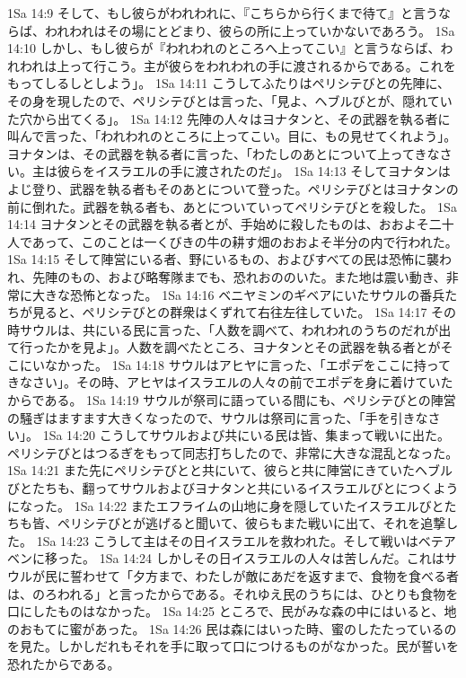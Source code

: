 1Sa 14:9  そして、もし彼らがわれわれに、『こちらから行くまで待て』と言うならば、われわれはその場にとどまり、彼らの所に上っていかないであろう。
1Sa 14:10  しかし、もし彼らが『われわれのところへ上ってこい』と言うならば、われわれは上って行こう。主が彼らをわれわれの手に渡されるからである。これをもってしるしとしよう」。
1Sa 14:11  こうしてふたりはペリシテびとの先陣に、その身を現したので、ペリシテびとは言った、「見よ、ヘブルびとが、隠れていた穴から出てくる」。
1Sa 14:12  先陣の人々はヨナタンと、その武器を執る者に叫んで言った、「われわれのところに上ってこい。目に、もの見せてくれよう」。ヨナタンは、その武器を執る者に言った、「わたしのあとについて上ってきなさい。主は彼らをイスラエルの手に渡されたのだ」。
1Sa 14:13  そしてヨナタンはよじ登り、武器を執る者もそのあとについて登った。ペリシテびとはヨナタンの前に倒れた。武器を執る者も、あとについていってペリシテびとを殺した。
1Sa 14:14  ヨナタンとその武器を執る者とが、手始めに殺したものは、おおよそ二十人であって、このことは一くびきの牛の耕す畑のおおよそ半分の内で行われた。
1Sa 14:15  そして陣営にいる者、野にいるもの、およびすべての民は恐怖に襲われ、先陣のもの、および略奪隊までも、恐れおののいた。また地は震い動き、非常に大きな恐怖となった。
1Sa 14:16  ベニヤミンのギベアにいたサウルの番兵たちが見ると、ペリシテびとの群衆はくずれて右往左往していた。
1Sa 14:17  その時サウルは、共にいる民に言った、「人数を調べて、われわれのうちのだれが出て行ったかを見よ」。人数を調べたところ、ヨナタンとその武器を執る者とがそこにいなかった。
1Sa 14:18  サウルはアヒヤに言った、「エポデをここに持ってきなさい」。その時、アヒヤはイスラエルの人々の前でエポデを身に着けていたからである。
1Sa 14:19  サウルが祭司に語っている間にも、ペリシテびとの陣営の騒ぎはますます大きくなったので、サウルは祭司に言った、「手を引きなさい」。
1Sa 14:20  こうしてサウルおよび共にいる民は皆、集まって戦いに出た。ペリシテびとはつるぎをもって同志打ちしたので、非常に大きな混乱となった。
1Sa 14:21  また先にペリシテびとと共にいて、彼らと共に陣営にきていたヘブルびとたちも、翻ってサウルおよびヨナタンと共にいるイスラエルびとにつくようになった。
1Sa 14:22  またエフライムの山地に身を隠していたイスラエルびとたちも皆、ペリシテびとが逃げると聞いて、彼らもまた戦いに出て、それを追撃した。
1Sa 14:23  こうして主はその日イスラエルを救われた。そして戦いはベテアベンに移った。
1Sa 14:24  しかしその日イスラエルの人々は苦しんだ。これはサウルが民に誓わせて「夕方まで、わたしが敵にあだを返すまで、食物を食べる者は、のろわれる」と言ったからである。それゆえ民のうちには、ひとりも食物を口にしたものはなかった。
1Sa 14:25  ところで、民がみな森の中にはいると、地のおもてに蜜があった。
1Sa 14:26  民は森にはいった時、蜜のしたたっているのを見た。しかしだれもそれを手に取って口につけるものがなかった。民が誓いを恐れたからである。
